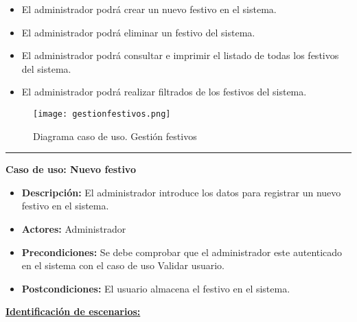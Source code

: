 \begin{itemize}
 \item El administrador podrá crear un nuevo festivo en el sistema.
 \item El administrador podrá eliminar un festivo del sistema.
 \item El administrador podrá consultar e imprimir el listado de todas los festivos del sistema.
 \item El administrador podrá realizar filtrados de los festivos del sistema.

\end{itemize}
\begin{figure}[H]
  \centering
    \texttt{[image: gestionfestivos.png]}
  \caption{Diagrama caso de uso. Gestión festivos}
  \label{cu8}
\end{figure}
\smallskip
\hrule height 1pt
\smallskip
\textbf{Caso de uso: Nuevo festivo}
\begin{itemize}\renewcommand{\labelitemi}{$\cdot$}
  \item \textbf{Descripción:} El administrador introduce los datos para registrar un nuevo festivo en el sistema.
  \item \textbf{Actores:} Administrador
  \item \textbf{Precondiciones:} Se debe comprobar que el administrador este autenticado en el sistema con el caso de uso Validar usuario.
  \item \textbf{Postcondiciones:} El usuario almacena el festivo en el sistema.
\end{itemize}
\underline{\textbf{Identificación de escenarios:}}
